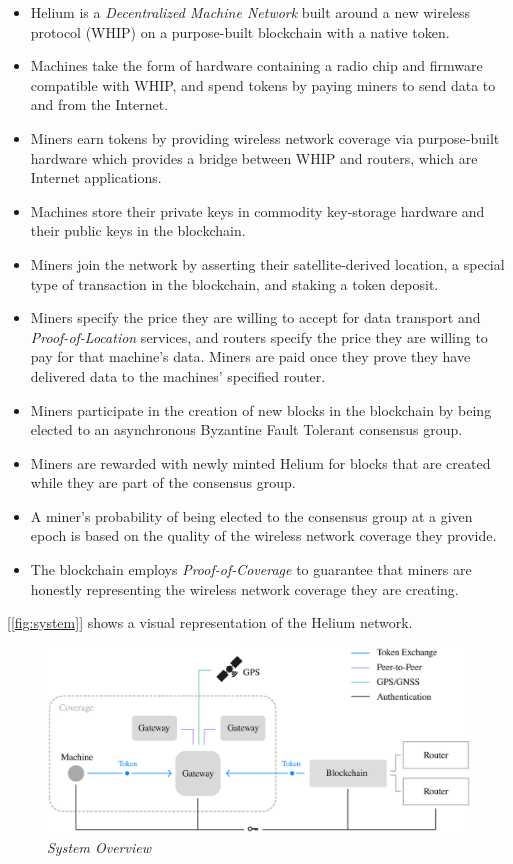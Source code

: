 \documentclass[10pt, nonatbib, nocopyrightspace, reprint]{sigplanconf}
\newcommand{\figref}[1]{[\autoref{#1}]}
\begin{document}
\begin{itemize}
    \item Helium is a \emph{Decentralized Machine Network} built around a new wireless protocol (WHIP) on a purpose-built blockchain with a native token.
    \item Machines take the form of hardware containing a radio chip and firmware compatible with WHIP, and spend tokens by paying miners to send data to and from the Internet.
    \item Miners earn tokens by providing wireless network coverage via purpose-built hardware which provides a bridge between WHIP and routers, which are Internet applications.
    \item Machines store their private keys in commodity key-storage hardware and their public keys in the blockchain.
    \item Miners join the network by asserting their satellite-derived location, a special type of transaction in the blockchain, and staking a token deposit.
    \item Miners specify the price they are willing to accept for data transport and \emph{Proof-of-Location} services, and routers specify the price they are willing to pay for that machine's data. Miners are paid once they prove they have delivered data to the machines' specified router.
    \item Miners participate in the creation of new blocks in the blockchain by being elected to an asynchronous Byzantine Fault Tolerant consensus group.
    \item Miners are rewarded with newly minted Helium for blocks that are created while they are part of the consensus group.
    \item A miner's probability of being elected to the consensus group at a given epoch is based on the quality of the wireless network coverage they provide.
    \item The blockchain employs \emph{Proof-of-Coverage} to guarantee that miners are honestly representing the wireless network coverage they are creating.
\end{itemize}

\figref{fig:system} shows a visual representation of the Helium network.

\begin{figure}[ht]
    \begin{center}
          \includegraphics[width=\textwidth]{schematic.eps}
          \caption{\emph{System Overview}}
          \label{fig:system}
     \end{center}
\end{figure}
\end{document}
